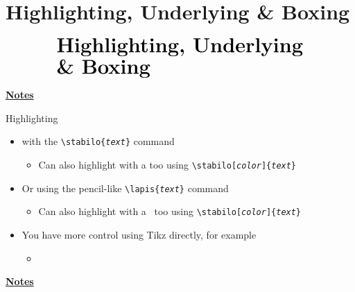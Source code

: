 \documentclass[10pt]{beamer}
\begin{document}
\section{Highlighting, Underlying \& Boxing}
\begin{frame}
    \begin{eqnarray*}
        &\text{{\huge \textbf{Highlighting, Underlying}}}\\
        &\text{{\huge \textbf{\& Boxing}}}\\
    \end{eqnarray*}
\end{frame}
\begin{flushleft}
    \underline{\textbf{Notes}}\setlength{\parskip}{.15cm}\notesize\newline\par
\end{flushleft}

\begin{frame}
    {Highlighting}
    \begin{itemize}
        \item {} with the \texttt{\textbackslash stabilo\{\textit{text}\}} command  \medskip
        \begin{itemize}
            \item Can also highlight with a  too using \texttt{\textbackslash stabilo[\textit{color}]\{\textit{text}\}}\bigskip\bigskip
        \end{itemize}
        \item Or  using the pencil-like \texttt{\textbackslash lapis\{\textit{text}\}} command \medskip
        \begin{itemize}
            \item Can also highlight with a  \ too using \texttt{\textbackslash stabilo[\textit{color}]\{\textit{text}\}}\bigskip\bigskip
        \end{itemize}
        \item You have more control using Tikz directly, for example \medskip
        \begin{itemize}
            \item {}
              \bigskip
        \end{itemize}
    \end{itemize}
\end{frame}
\begin{flushleft}
    \underline{\textbf{Notes}}\setlength{\parskip}{.15cm}\notesize\newline\par
\end{flushleft}
\end{document}
